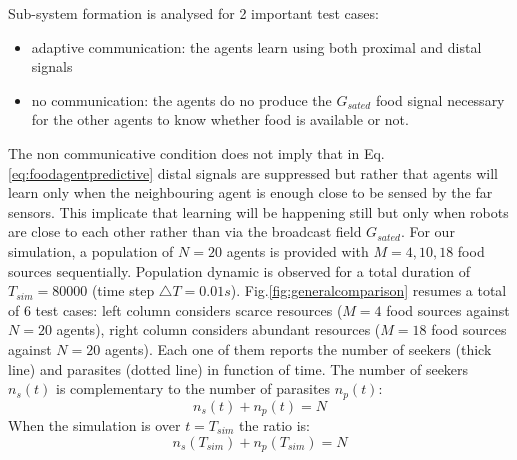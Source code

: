 Sub-system formation is analysed for 2 important test cases:
\begin{itemize}
 \item adaptive communication: the agents learn using both proximal and distal signals
 \item no communication: the agents do no produce the $G_{sated}$ food signal necessary
for the other agents to know whether food is available or not.
\end{itemize}
The non communicative condition does not imply that in Eq. \ref{eq:foodagentpredictive} distal
signals are suppressed but rather that agents will learn only when the neighbouring agent
is enough close to be sensed by the far sensors.
This implicate that learning will be happening still but only when robots are close 
to each other rather than via the broadcast field  $G_{sated}$.
For our simulation, a population of $N=20$ agents is provided with $M=4,10,18$ food sources sequentially.
Population dynamic is observed for a total duration of  $T_{sim}=80000$ (time step $\triangle T=0.01 s$).
Fig.\ref{fig:generalcomparison} resumes a total of 6 test cases: left column considers scarce resources
 ($M=4$ food sources against $N=20$ agents), right column considers abundant resources ($M=18$ food sources against $N=20$ agents).
Each one of them reports the number of seekers (thick line) and parasites (dotted line) in function of time.
The number of seekers $n_{s}(t)$ is complementary to the number of parasites $n_{p}(t)$: 
\begin{equation}
n_{s}(t)+n_{p}(t)=N \label{eq:social:ratio} 
\end{equation}
When the simulation is over $t=T_{sim}$ the ratio is:
\begin{equation}
n_{s}(T_{sim})+n_{p}(T_{sim})=N \label{eq:social:ratiofin} 
\end{equation}

